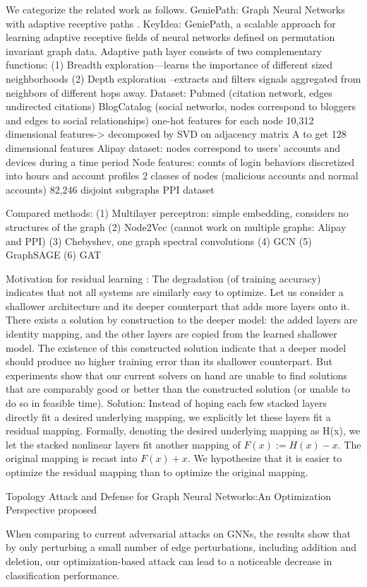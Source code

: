  We categorize the related work as follows.
GeniePath: Graph Neural Networks with adaptive receptive paths \cite{liu2019geniepath}.
KeyIdea:
GeniePath, a scalable approach for learning adaptive receptive fields of neural networks defined on permutation invariant graph data. 
Adaptive path layer consists of two complementary functions: 
(1)	Breadth exploration—learns the importance of different sized neighborhoods
(2)	Depth exploration –extracts and filters signals aggregated from neighbors of different hops away.
Dataset:
Pubmed (citation network, edges undirected citations)
BlogCatalog  (social networks, nodes correspond to bloggers and edges to social relationships)
one-hot features for each node 10,312 dimensional features-> decomposed by SVD on adjacency matrix A to get 128 dimensional features
Alipay dataset:  nodes correspond to users’ accounts and devices during a time period
		Node features: counts of login behaviors discretized into hours and account profiles
2 classes of nodes (malicious accounts and normal accounts)
82,246 disjoint subgraphs
PPI dataset

Compared methods:
(1)	Multilayer perceptron: simple embedding, considers no structures of the graph
(2)	Node2Vec (cannot work on multiple graphs: Alipay and PPI)
(3)	Chebyshev, one graph spectral convolutions 
(4)	GCN 
(5)	GraphSAGE
(6)	GAT

Motivation for residual learning \cite{he2016deep}: 
The degradation (of training accuracy) indicates that not all systems are similarly easy to optimize. Let us consider a shallower architecture and its deeper counterpart that adds more layers onto it. There exists a solution by construction to the deeper model: the added layers are identity mapping, and the other layers are copied from the learned shallower model. The existence of this constructed solution indicate that a deeper model should produce no higher training error than its shallower counterpart. But experiments show that our current solvers on hand are unable to find solutions that are comparably good or better than the constructed solution (or unable to do so in feasible time).
Solution:
Instead of hoping each few stacked layers directly fit a desired underlying mapping, we explicitly let these layers fit a residual mapping. Formally, denoting the desired underlying mapping as H(x), we let the stacked nonlinear layers fit another mapping of ${F(x) := H(x)- x}$. The original mapping is recast into ${F(x)+x}$. We hypothesize that it is easier to optimize the residual mapping than to optimize the original mapping.

Topology Attack and Defense for Graph Neural Networks:An Optimization Perspective \cite{xu2019topology} proposed 

When comparing to current adversarial attacks on GNNs, the results show that by only perturbing a small number of edge perturbations, including addition and deletion, our optimization-based attack can lead to a noticeable decrease in classification performance.





